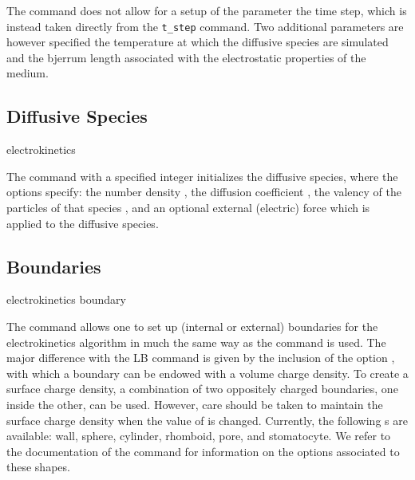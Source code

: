 The  command does not allow for a setup of the parameter 
 the time step, which is instead taken directly from the 
\texttt{t\_step} command. Two additional parameters are however specified
 the temperature at which the diffusive species are simulated and 
 the bjerrum length associated with the electrostatic 
properties of the medium.

\subsection{\label{ssec:ek-diff-species}Diffusive Species}

\begin{essyntax}
  electrokinetics 
  \begin{features}
  \end{features}
\end{essyntax}
The  command with a specified integer 
initializes the diffusive species, where the options specify: the number density
, the diffusion coefficient , the valency of the particles 
of that species , and an optional external (electric) force which is
applied to the diffusive species. 

\subsection{\label{ssec:ek-boundaries}Boundaries}

\begin{essyntax}
  electrokinetics boundary 
    
  \begin{features}
  \end{features}
\end{essyntax}

The  command allows one to set up (internal or external) boundaries
for the electrokinetics algorithm in much the same way as the  
command is used. The major difference with the LB command is given by the inclusion
of the option , with which a boundary can be endowed with a
volume charge density. To create a surface charge density, a combination of two
oppositely charged boundaries, one inside the other, can be used. However, care
should be taken to maintain the surface charge density when the value of 
 is changed. Currently, the following s are available:
wall, sphere, cylinder, rhomboid, pore, and stomatocyte. We refer to the 
documentation of the  command for information on the options
associated to these shapes.

